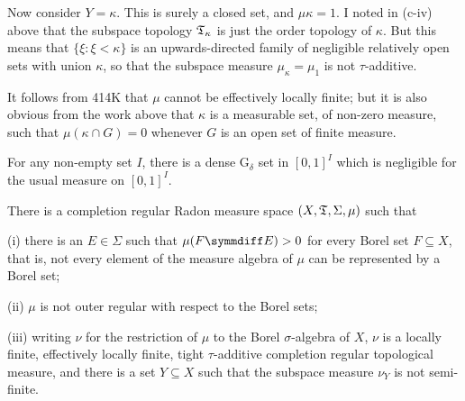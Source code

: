 {\medskip

 Now consider $Y=\kappa$.   This is surely a closed
set, and $\mu\kappa=1$.   I noted in (c-iv) above that the subspace
topology $\frak T_{\kappa}$ is just the order topology of $\kappa$.
But this means that $\{\xi:\xi<\kappa\}$ is an upwards-directed family
of negligible relatively open sets with union $\kappa$, so that the
subspace measure $\mu_{\kappa}=\mu_1$ is not $\tau$-additive.

\medskip

 It follows from 414K that $\mu$ cannot be effectively
locally finite;  but it is also obvious from the work above that
$\kappa$ is a measurable set, of non-zero measure, such that
$\mu(\kappa\cap G)=0$
whenever $G$ is an open set of finite measure.
}%



 For any non-empty set $I$, there is a dense
G$_{\delta}$ set in $[0,1]^I$ which is negligible for the usual measure
on $[0,1]^I$.


 There is a
completion regular Radon measure space $(X,\frak T,\Sigma,\mu)$ such
that

(i) there is an $E\in\Sigma$ such that $\mu(F\symmdiff E)>0$ for
every Borel set $F\subseteq X$, that is, not every element of the
measure algebra of $\mu$ can be represented by a Borel set;

(ii) $\mu$ is not outer regular with respect to the Borel sets;

(iii) writing $\nu$ for the restriction of $\mu$ to the Borel
$\sigma$-algebra of $X$, $\nu$ is a locally finite, effectively locally
finite, tight $\tau$-additive completion regular
topological measure, and there is a set
$Y\subseteq X$ such that the subspace measure $\nu_Y$ is not semi-finite.

